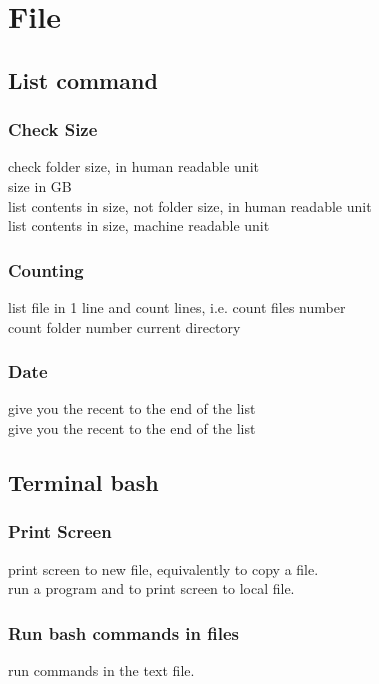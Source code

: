 \chapter{File}

\section{List command}
\subsection{Check Size}
 check folder size, in human readable unit\\
 size in GB\\
 list contents in size, not folder size, in human readable unit\\
 list contents in size, machine readable unit\\

\subsection{Counting}
 list file in 1 line and count lines, i.e. count files number\\
 count folder number current directory

\subsection{Date}
 give you the recent to the end of the list\\
 give you the recent to the end of the list\\

\section{Terminal bash}
\subsection{Print Screen}
 print screen to new file, equivalently to copy a file. \\
 run a program and to print screen to local file.

\subsection{Run bash commands in files}
 run commands in the text file.

